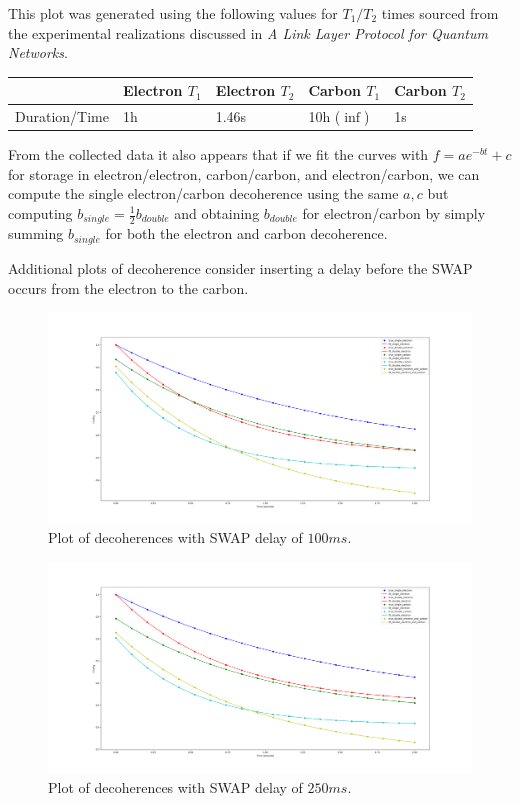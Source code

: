 \documentclass{article}
\begin{document}
This plot was generated using the following values for $T_1/T_2$ times sourced from the experimental realizations discussed in \emph{A Link Layer Protocol for Quantum Networks}.

\begin{table}[!htb]
\centering
\begin{tabular}{|l|l|l|l|l|}
\hline
              & Electron $T_1$ & Electron $T_2$ & Carbon $T_1$ & Carbon $T_2$ \\
\hline
Duration/Time & 1h            & 1.46s       & 10h ($\inf$) & 1s          \\
\hline
\end{tabular}
\end{table}

From the collected data it also appears that if we fit the curves with $f=ae^{-bt}+c$ for storage in electron/electron, carbon/carbon, and electron/carbon, we can compute the single electron/carbon decoherence using the same $a,c$ but computing $b_{single}=
\frac{1}{2}b_{double}$ and obtaining $b_{double}$ for electron/carbon by simply summing $b_{single}$ for both the electron and carbon decoherence.

Additional plots of decoherence consider inserting a delay before the SWAP occurs from the electron to the carbon.
\begin{figure}[!htb]
    \centering
    \includegraphics[width=\textwidth]{figures/decoherence_swap_delay_100ms.png}
    \caption{Plot of decoherences with SWAP delay of $100ms$.}
    \label{fig:decoherence_100_delay}
\end{figure}

\begin{figure}[!htb]
    \centering
    \includegraphics[width=\textwidth]{figures/decoherence_swap_delay_250ms.png}
    \caption{Plot of decoherences with SWAP delay of $250ms$.}
    \label{fig:decoherence_250_delay}
\end{figure}
\end{document}
